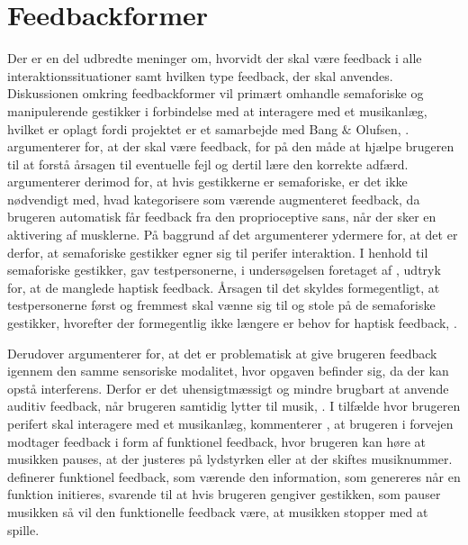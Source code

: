\section{Feedbackformer}
\label{Feedbackformer}
%
Der er en del udbredte meninger om, hvorvidt der skal være feedback i alle interaktionssituationer samt hvilken type feedback, der skal anvendes. Diskussionen omkring feedbackformer vil primært omhandle semaforiske og manipulerende gestikker i forbindelse med at interagere med et musikanlæg, hvilket er oplagt fordi projektet er et samarbejde med Bang $\&$ Olufsen, . \blankline
%
\textcite[s. 10]{PDF:NaturalUserInterfaces} argumenterer for, at der skal være feedback, for på den måde at hjælpe brugeren til at forstå årsagen til eventuelle fejl og dertil lære den korrekte adfærd. \textcite[s. 16]{PDF:PIEmbeddingHCIOnTheRelevance} argumenterer derimod for, at hvis gestikkerne er semaforiske, er det ikke nødvendigt med, hvad \textcite[s. 16]{PDF:PIEmbeddingHCIOnTheRelevance} kategorisere som værende augmenteret feedback, da brugeren automatisk får feedback fra den proprioceptive sans, når der sker en aktivering af musklerne. På baggrund af det argumenterer \textcite[s. 16]{PDF:PIEmbeddingHCIOnTheRelevance} ydermere for, at det er derfor, at semaforiske gestikker egner sig til perifer interaktion. I henhold til semaforiske gestikker, gav testpersonerne, i undersøgelsen foretaget af \textcite[ss. 172-173]{PDF:ComparingInputModalities}, udtryk for, at de manglede haptisk feedback. Årsagen til det skyldes formegentligt, at testpersonerne først og fremmest skal vænne sig til og stole på de semaforiske gestikker, hvorefter der formegentlig ikke længere er behov for haptisk feedback, \parencite[s. 174]{PDF:ComparingInputModalities}. 

Derudover argumenterer \textcite[s. 3]{PDF:FacilitatingPIDesignAndEvaluation} for, at det er problematisk at give brugeren feedback igennem den samme sensoriske modalitet, hvor opgaven befinder sig, da der kan opstå interferens. Derfor er det uhensigtmæssigt og mindre brugbart at anvende auditiv feedback, når brugeren samtidig lytter til musik, \parencite[s. 3]{PDF:FacilitatingPIDesignAndEvaluation}. I tilfælde hvor brugeren perifert skal interagere med et musikanlæg, kommenterer \textcite[s. 19]{PDF:PIEmbeddingHCIOnTheRelevance}, at brugeren i forvejen modtager feedback i form af funktionel feedback, hvor brugeren kan høre at musikken pauses, at der justeres på lydstyrken eller at der skiftes musiknummer. \textcite[s. 3]{PDF:InteractionFrogger} definerer funktionel feedback, som værende den information, som genereres når en funktion initieres, svarende til at hvis brugeren gengiver gestikken, som pauser musikken så vil den funktionelle feedback være, at musikken stopper med at spille. 

